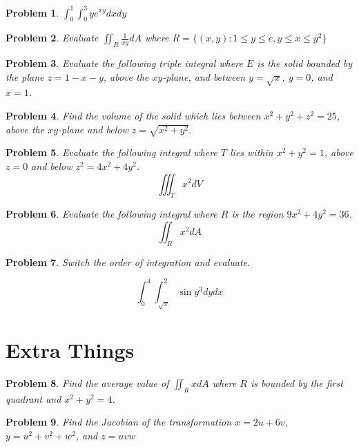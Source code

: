 \documentclass[11pt]{article}
\newtheorem{problem}{Problem}
\begin{document}
\begin{problem}
$\int_{0}^{1}\int_{0}^{3} ye^{xy} dx dy$
\end{problem}

\begin{problem}
    Evaluate $\iint_R \frac{1}{xy} d{A}$ where $R = \{(x,y) : 1 \leq y \leq e, y \leq x \leq y^2\}$
\end{problem}

\begin{problem}
    Evaluate the following triple integral where $E$ is the solid bounded by the plane $z= 1-x-y$, above the $xy$-plane, and between $y=\sqrt{x}$, $y=0$, and $x=1$.
\end{problem}

\begin{problem}
    Find the volume of the solid which lies between $x^2 + y^2+ z^2 = 25$, above the $xy$-plane and below $z = \sqrt{x^2+y^2}$.
\end{problem}

\begin{problem}
    Evaluate the following integral where $T$ lies within $x^2+y^2=1$, above $z=0$ and below $z^2 = 4x^2+4y^2$. \[\iiint_T x^2 dV\]
\end{problem}


\begin{problem}
    Evaluate the following integral where $R$ is the region $9x^2+4y^2=36$. \[\iint_R x^2 dA\]
\end{problem}

\begin{problem}
Switch the order of integration and evaluate.

\begin{equation*}
\int_0^4 \int_{\sqrt{x}}^2 \sin{y^3} d{y} d{x}
\end{equation*}
\end{problem}




\section{Extra Things}

\begin{problem}
    Find the average value of $\iint_R x dA$ where $R$ is bounded by the first quadrant  and $x^2+y^2=4$.
\end{problem}

\begin{problem}
    Find the Jacobian of the transformation $x = 2u+6v$, $y=u^2+v^2+w^2$, and $z=uvw$
\end{problem}
\end{document}
